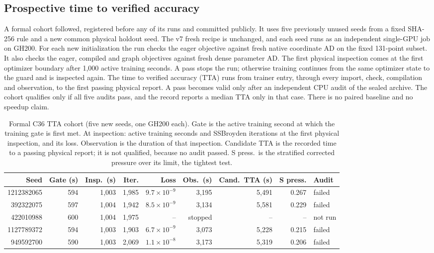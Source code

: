 \documentclass[11pt]{article}
\begin{document}
\subsection{Prospective time to verified accuracy}\label{sec:c36tta}
A formal cohort followed, registered before any of its runs and committed
publicly. It uses five previously unused seeds from a fixed SHA-256 rule
and a new common physical holdout seed. The v7 fresh recipe is unchanged,
and each seed runs as an independent single-GPU job on GH200. For each new
initialization the run checks the eager objective against fresh native
coordinate AD on the fixed 131-point subset. It also checks the eager,
compiled and graph objectives against fresh dense parameter AD. The first
physical inspection comes at the first optimizer boundary after 1,000
active training seconds. A pass stops the run; otherwise training continues
from the same optimizer state to the guard and is inspected again. The time
to verified accuracy (TTA) runs from trainer entry, through every import,
check, compilation and observation, to the first passing physical report.
A pass becomes valid only after an independent CPU audit of the sealed
archive. The cohort qualifies only if all five audits pass, and the record
reports a median TTA only in that case. There is no paired baseline and no
speedup claim.

\begin{table}[htbp]\centering\small
\setlength{\tabcolsep}{4pt}
\caption{Formal C36 TTA cohort (five new seeds, one GH200 each). Gate is
the active training second at which the training gate is first met. At
inspection: active training seconds and SSBroyden iterations at the first
physical inspection, and its loss. Observation is the duration of that
inspection. Candidate TTA is the recorded time to a passing physical
report; it is not qualified, because no audit passed. S press.\ is the
stratified corrected pressure over its limit, the tightest test.}
\label{tab:c36tta}
\begin{tabular}{rrrrrrrrl}\toprule
Seed & Gate (s) & Insp.~(s) & Iter. & Loss & Obs.~(s) & Cand.~TTA (s) & S press. & Audit\\\midrule
1212382065 & 594 & 1,003 & 1,985 & $9.7\times10^{-9}$ & 3,195 & 5,491 & 0.267 & failed\\
392322075 & 597 & 1,004 & 1,942 & $8.5\times10^{-9}$ & 3,134 & 5,581 & 0.229 & failed\\
422010988 & 600 & 1,004 & 1,975 & -- & stopped & -- & -- & not run\\
1127789372 & 594 & 1,003 & 1,903 & $6.7\times10^{-9}$ & 3,073 & 5,228 & 0.215 & failed\\
949592700 & 590 & 1,003 & 2,069 & $1.1\times10^{-8}$ & 3,173 & 5,319 & 0.206 & failed
\\\bottomrule\end{tabular}
\end{table}
\end{document}
